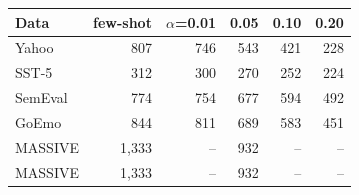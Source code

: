 \begin{tabular}{lrrrrr}
\toprule
Data & few-shot & $\alpha$=0.01 & 0.05 & 0.10 & 0.20 \\
\midrule
Yahoo & 807 & 746 & 543 & 421 & 228 \\
SST-5 & 312 & 300 & 270 & 252 & 224 \\
SemEval & 774 & 754 & 677 & 594 & 492 \\
GoEmo & 844 & 811 & 689 & 583 & 451 \\
MASSIVE & 1,333 & -- & 932 & -- & -- \\
MASSIVE & 1,333 & -- & 932 & -- & -- \\
\bottomrule
\end{tabular}
